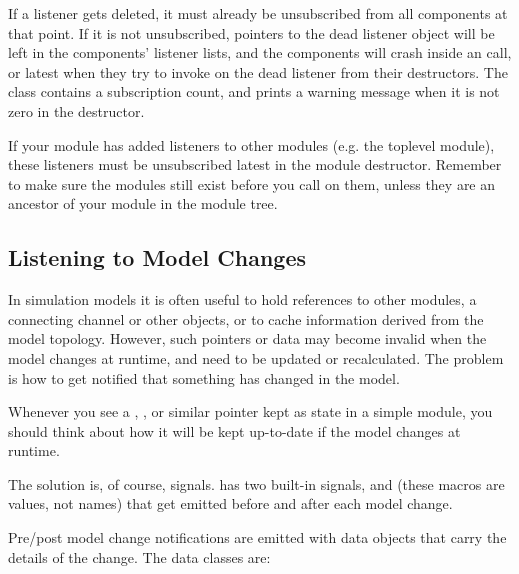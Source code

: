 If a listener gets deleted, it must already be unsubscribed from all
components at that point. If it is not unsubscribed, pointers to the dead
listener object will be left in the components' listener lists, and the
components will crash inside an  call, or latest when they
try to invoke  on the dead listener from their
destructors. The  class contains a subscription count,
and prints a warning message when it is not zero in the destructor.

\begin{note}
  If your module has added listeners to other modules (e.g. the toplevel
  module), these listeners must be unsubscribed latest in the module
  destructor. Remember to make sure the modules still exist before you
  call  on them, unless they are an ancestor
  of your module in the module tree.
\end{note}


\subsection{Listening to Model Changes}
\label{sec:ch-simple-modules:model-change}

In simulation models it is often useful to hold references to other
modules, a connecting channel or other objects, or to cache information
derived from the model topology. However, such pointers or data may
become invalid when the model changes at runtime, and need to be updated
or recalculated. The problem is how to get notified that something has
changed in the model.

\begin{note}
  Whenever you see a , ,  or
  similar pointer kept as state in a simple module, you should think about
  how it will be kept up-to-date if the model changes at runtime.
\end{note}

The solution is, of course, signals. {\opp} has two built-in signals,
 and  (these macros
are  values, not names) that get emitted before and
after each model change.

Pre/post model change notifications are emitted with data objects that
carry the details of the change. The data classes are:

